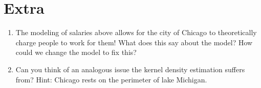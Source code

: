 \documentclass[11pt,noanswers,addpoints]{exam}
\begin{document}
\section{Extra}

\begin{enumerate}
\item The modeling of salaries above allows for the city of Chicago to theoretically charge people to work for them! What does this say 
about the model? How could we change the model to fix this?
\item Can you think of an analogous issue the kernel density estimation suffers from? Hint: Chicago rests on the perimeter of lake Michigan.
\end{enumerate}
\end{document}
